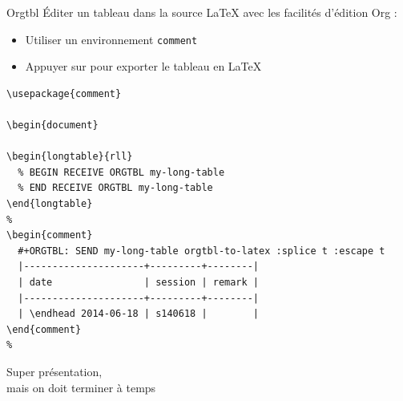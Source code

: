 \documentclass[t]{beamer}
\let\ORIkeys\keys
\renewcommand{\keys}[1]{\ORIkeys{\texttt{#1}}}
\begin{document}
\begin{frame}[fragile,label={sec:org5d9faaa}]{Orgtbl}
 Éditer un tableau dans la source \LaTeX{} avec les facilités d'édition Org :
\begin{itemize}
\item Utiliser un environnement \texttt{comment}
\item Appuyer sur \keys{C-c} \keys{C-c} pour exporter le tableau en \LaTeX{}
\end{itemize}

\lstset{language=[LaTeX]TeX,label= ,caption= ,captionpos=b,numbers=none}
\begin{lstlisting}
\usepackage{comment}

\begin{document}

\begin{longtable}{rll}
  % BEGIN RECEIVE ORGTBL my-long-table
  % END RECEIVE ORGTBL my-long-table
\end{longtable}
%
\begin{comment}
  #+ORGTBL: SEND my-long-table orgtbl-to-latex :splice t :escape t
  |---------------------+---------+--------|
  | date                | session | remark |
  |---------------------+---------+--------|
  | \endhead 2014-06-18 | s140618 |        |
\end{comment}
%
\end{lstlisting}
\end{frame}

\begin{frame}[c,plain,label={sec:orgb1560cf}]{}
\begin{center}
\Huge{Super présentation, \\ mais on doit terminer à temps}
\end{center}
\end{frame}
\end{document}

